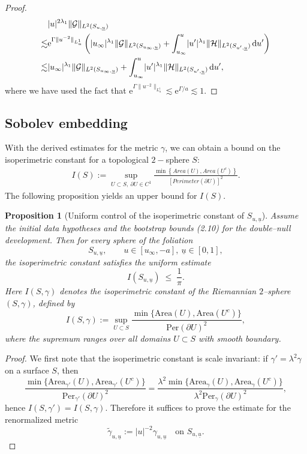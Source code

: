 \documentclass{amsart}
\newtheorem{proposition}{Proposition}[section]
\newcommand{\twoSuprime}[1]{\lVert #1 \rVert_{L^2(S_{u^{\prime},\ubar})}}
\newcommand{\intu}{\int_{u_{\infty}}^u}
\newcommand{\ubar}{\underline{u}}
\newcommand{\twoSu}[1]{\lVert{#1} \rVert_{L^2(S_{u,\ubar})}}
\newcommand{\duprime}{\hspace{.5mm} \text{d}u^{\prime}}
\begin{document}
{\begin{proof}
\begin{equation}
\begin{split}
&\lvert u \rvert^{2 \lambda_1} \twoSu{ \mathcal{G} } \\ \lesssim &\mathrm{e}^{\Gamma \lVert u^{-2} \rVert_{L_u^1}}\left( \lvert u_{\infty}\rvert^{\lambda_1}\lVert \mathcal{G} \rVert_{L^2(S_{u_{\infty}, \ubar})} + \intu \lvert u^{\prime}\rvert^{\lambda_1 } \twoSuprime{\mathcal{H}}\duprime \right) \\ \lesssim &\lvert u_{\infty}\rvert^{\lambda_1}\lVert \mathcal{G} \rVert_{L^2(S_{u_{\infty}, \ubar})} + \intu \lvert u^{\prime}\rvert^{\lambda_1 } \twoSuprime{\mathcal{H}}\duprime, 
\end{split} 
\end{equation}where we have used the fact that $\mathrm{e}^{\Gamma \lVert u^{-2} \rVert_{L_u^1}} \lesssim \mathrm{e}^{\Gamma/ a} \lesssim  1$.


\end{proof}

\subsection{Sobolev embedding}
\noindent With the derived estimates for the metric $\gamma$, we can obtain a bound on the isoperimetric constant for a topological $2-$sphere $S$: 
\begin{eqnarray}
I(S):=\sup_{U\subset S,~\partial U\in C^{1}}\frac{\min\left\{Area(U),Area(U^{c})\right\}}{[Perimeter(\partial U)]^{2}}.
\end{eqnarray}
The following proposition yields an upper bound for $I(S)$.\\
\begin{proposition}[Uniform control of the isoperimetric constant of $S_{u,\ubar}$]
\label{prop:isoperimetric-uniform}
Assume the initial data hypotheses and the bootstrap bounds \textnormal{(2.10)} for the double--null development. Then for every sphere of the foliation
\[
S_{u,\ubar},\qquad u\in [u_{\infty},-a],\ \ubar\in[0,1],
\]
the isoperimetric constant satisfies the uniform estimate
\begin{equation}\label{eq:isoperimetric-bound}
I(S_{u,\ubar})\;\le\;\frac{1}{\pi}.
\end{equation}
Here $I(S,\gamma)$ denotes the isoperimetric constant of the Riemannian $2$–sphere $(S,\gamma)$, defined by
\[
I(S,\gamma)
:=
\sup_{U\subset S}
\frac{\min\{\text{Area}(U),\text{Area}(U^{c})\}}{\text{Per}(\partial U)^2},
\]
where the supremum ranges over all domains $U\subset S$ with smooth boundary.
\end{proposition}
\begin{proof}
We first note that the isoperimetric constant is scale invariant: if $\gamma'=\lambda^{2}\gamma$ on a surface $S$, then
\[
\frac{\min\{\text{Area}_{\gamma'}(U),\text{Area}_{\gamma'}(U^{c})\}}{\text{Per}_{\gamma'}(\partial U)^2}
=
\frac{\lambda^{2}\min\{\text{Area}_{\gamma}(U),\text{Area}_{\gamma}(U^{c})\}}{\lambda^{2}\text{Per}_{\gamma}(\partial U)^2},
\]
hence $I(S,\gamma')=I(S,\gamma)$. Therefore it suffices to prove the estimate for the renormalized metric
\[
\tilde\gamma_{u,\ubar}:=|u|^{-2}\gamma_{u,\ubar}
\quad\text{on }S_{u,\ubar}.
\]


\end{proof}}
\end{document}
